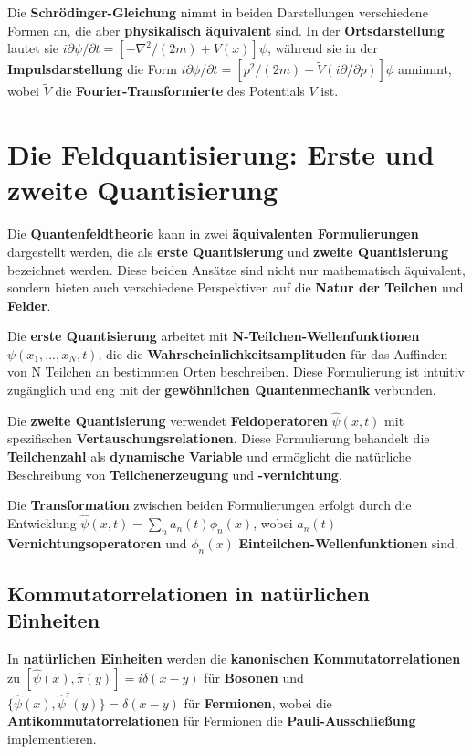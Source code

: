\documentclass[12pt,a4paper]{report}
\begin{document}
	Die \textbf{Schrödinger-Gleichung} nimmt in beiden Darstellungen verschiedene Formen an, die aber \textbf{physikalisch äquivalent} sind. In der \textbf{Ortsdarstellung} lautet sie $i\partial\psi/\partial t = [-\nabla^2/(2m) + V(x)]\psi$, während sie in der \textbf{Impulsdarstellung} die Form $i\partial\phi/\partial t = [p^2/(2m) + \tilde{V}(i\partial/\partial p)]\phi$ annimmt, wobei $\tilde{V}$ die \textbf{Fourier-Transformierte} des Potentials $V$ ist.
	
	\section{Die Feldquantisierung: Erste und zweite Quantisierung}
	
	Die \textbf{Quantenfeldtheorie} kann in zwei \textbf{äquivalenten Formulierungen} dargestellt werden, die als \textbf{erste Quantisierung} und \textbf{zweite Quantisierung} bezeichnet werden. Diese beiden Ansätze sind nicht nur mathematisch äquivalent, sondern bieten auch verschiedene Perspektiven auf die \textbf{Natur der Teilchen} und \textbf{Felder}.
	
	Die \textbf{erste Quantisierung} arbeitet mit \textbf{N-Teilchen-Wellenfunktionen} $\psi(x_1,...,x_N,t)$, die die \textbf{Wahrscheinlichkeitsamplituden} für das Auffinden von N Teilchen an bestimmten Orten beschreiben. Diese Formulierung ist intuitiv zugänglich und eng mit der \textbf{gewöhnlichen Quantenmechanik} verbunden.
	
	Die \textbf{zweite Quantisierung} verwendet \textbf{Feldoperatoren} $\hat{\psi}(x,t)$ mit spezifischen \textbf{Vertauschungsrelationen}. Diese Formulierung behandelt die \textbf{Teilchenzahl} als \textbf{dynamische Variable} und ermöglicht die natürliche Beschreibung von \textbf{Teilchenerzeugung} und \textbf{-vernichtung}.
	
	Die \textbf{Transformation} zwischen beiden Formulierungen erfolgt durch die Entwicklung $\hat{\psi}(x,t) = \sum_n a_n(t)\phi_n(x)$, wobei $a_n(t)$ \textbf{Vernichtungsoperatoren} und $\phi_n(x)$ \textbf{Einteilchen-Wellenfunktionen} sind.
	
	\subsection{Kommutatorrelationen in natürlichen Einheiten}
	
	In \textbf{natürlichen Einheiten} werden die \textbf{kanonischen Kommutatorrelationen} zu $[\hat{\psi}(x), \hat{\pi}(y)] = i\delta(x-y)$ für \textbf{Bosonen} und $\{\hat{\psi}(x), \hat{\psi}^\dagger(y)\} = \delta(x-y)$ für \textbf{Fermionen}, wobei die \textbf{Antikommutatorrelationen} für Fermionen die \textbf{Pauli-Ausschließung} implementieren.
	
\end{document}
